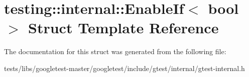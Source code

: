 \hypertarget{structtesting_1_1internal_1_1EnableIf}{}\section{testing\+:\+:internal\+:\+:Enable\+If$<$ bool $>$ Struct Template Reference}
\label{structtesting_1_1internal_1_1EnableIf}


The documentation for this struct was generated from the following file\+:\begin{DoxyCompactItemize}
\item 
tests/libs/googletest-\/master/googletest/include/gtest/internal/gtest-\/internal.\+h\end{DoxyCompactItemize}
